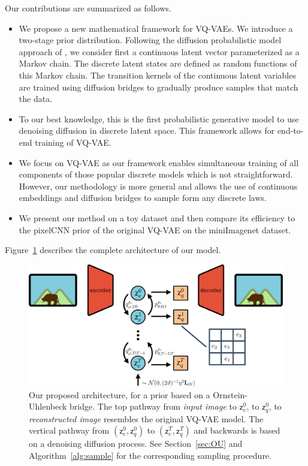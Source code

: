 \documentclass{article}
\theoremstyle{plain}
\theoremstyle{definition}
\theoremstyle{remark}
\newcommand{\latentcont}{\mathsf{z}_e}
\newcommand{\latentdis}{\mathsf{z}_q}
\begin{document}
 Our contributions are summarized as follows.
\begin{itemize}
    \item We propose a new mathematical framework for VQ-VAEs. We introduce a two-stage prior distribution. Following the diffusion probabilistic model approach of \cite{ho2020denoising}, we consider first a continuous latent vector parameterized as a Markov chain. The discrete latent states are defined  as random functions of this Markov chain. The  transition kernels of the continuous latent variables are trained using diffusion bridges to gradually produce samples that match the data.
    \item  To our best knowledge, this is the first probabilistic generative model to use denoising diffusion in discrete latent space. This framework allows for end-to-end training of VQ-VAE.
    \item We focus on VQ-VAE as our framework enables simultaneous training of all components of those popular discrete models which is not straightforward. However, our methodology is  more general and allows the use of continuous embeddings and diffusion bridges to sample form any discrete laws.
    \item We present our method on a toy dataset and then compare its efficiency to the pixelCNN prior of the original VQ-VAE on the miniImagenet dataset.
\end{itemize}
Figure~\ref{fig:archi} describes the complete architecture of our model.
\begin{figure}[h]
    \centering
    \includegraphics[width=.8\linewidth]{images/Archi.png}
    \caption{Our proposed architecture, for a prior based on a Ornstein-Uhlenbeck bridge. The top pathway from \textit{input image} to $\latentcont^0$, to $\latentdis^0$, to \textit{reconstructed image} resembles the original VQ-VAE model. The vertical pathway from $(\latentcont^0, \latentdis^0)$ to $(\latentcont^T, \latentdis^T)$ and backwards is based on a denoising diffusion process. See Section~\ref{sec:OU} and Algorithm~\ref{alg:sample} for the corresponding sampling procedure.}
    \label{fig:archi}
\end{figure}
\end{document}
